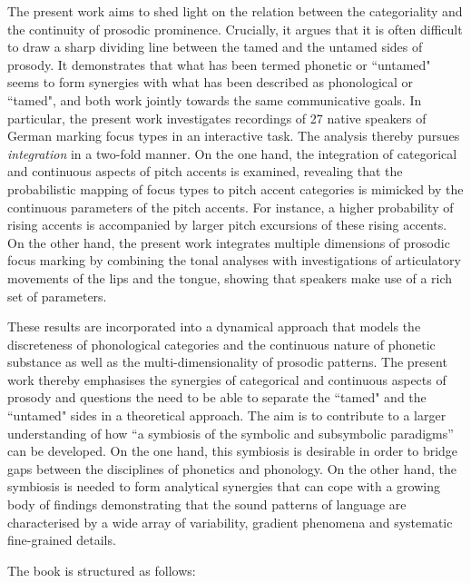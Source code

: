 The present work aims to shed light on the relation between the categoriality and the continuity of prosodic prominence. Crucially, it argues that it is often difficult to draw a sharp dividing line between the tamed and the untamed sides of prosody. It demonstrates that what has been termed phonetic or ``untamed" seems to form synergies with what has been described as phonological or ``tamed", and both work jointly towards the same communicative goals. In particular, the present work investigates recordings of 27 native speakers of German marking focus types in an interactive task. The analysis thereby pursues \emph{integration} in a two-fold manner. On the one hand, the integration of categorical and continuous aspects of pitch accents is examined, revealing that the probabilistic mapping of focus types to pitch accent categories is mimicked by the continuous parameters of the pitch accents. For instance, a higher probability of rising accents is accompanied by larger pitch excursions of these rising accents. On the other hand, the present work integrates multiple dimensions of prosodic focus marking by combining the tonal analyses with investigations of articulatory movements of the lips and the tongue, showing that speakers make use of a rich set of parameters.

These results are incorporated into a dynamical approach that models the discreteness of phonological categories and the continuous nature of phonetic substance as well as the multi-dimensionality of prosodic patterns. The present work thereby emphasises the synergies of categorical and continuous aspects of prosody and questions the need to be able to separate the ``tamed" and the ``untamed" sides in a theoretical approach. The aim is to contribute to a larger understanding of how ``a symbiosis of the symbolic and subsymbolic paradigms” \citep[19]{Smolensky1988} can be developed. On the one hand, this symbiosis is desirable in order to bridge gaps between the disciplines of phonetics and phonology. On the other hand, the symbiosis is needed to form analytical synergies that can cope with a growing body of findings  demonstrating that the sound patterns of language are characterised by a wide array of variability, gradient phenomena and systematic fine-grained details.

The book is structured as follows:

